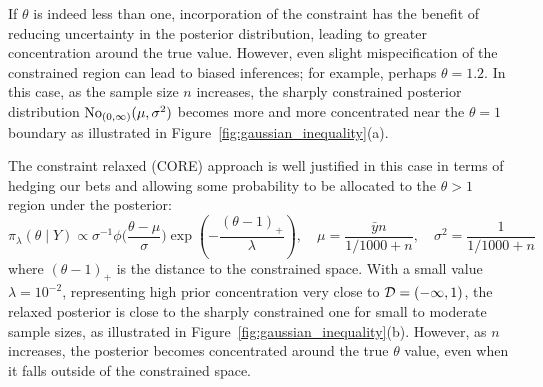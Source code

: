 \documentclass[10pt,fleqn]{article}
\DeclareMathOperator{\1}{\mathbbm{1}} \DeclareMathOperator{\bigO}{\mc O}
\begin{document}
If $\theta$ is indeed less than one, incorporation of the constraint has the benefit of reducing uncertainty in the posterior distribution, leading to greater concentration around the true value.  However, even slight mispecification of the constrained region can lead to biased inferences; for example, perhaps $\theta=1.2.$
In this case, as the sample size $n$ increases, the sharply constrained posterior distribution $\operatorname{No}_{(0,\infty)}(\mu,\sigma^2)$ becomes more and more concentrated near the $\theta=1$ boundary as illustrated in Figure~\ref{fig:gaussian_inequality}(a).

The constraint relaxed (CORE) approach is well justified in this case in terms of hedging our bets and allowing some probability to be allocated to the $\theta>1$ region under the posterior: 
$$ \pi_{\lambda}(\theta \mid Y) \propto {\sigma^{-1}}\phi\bigg(\frac{\theta- \mu}{\sigma}\bigg) \exp(-\frac{(\theta-1)_+ }{\lambda}) , \quad \mu=    \frac{ \bar y n}{ 1/1000 + n },   \quad \sigma^2 = \frac{1}{ 1/1000 + n }$$
where $(\theta-1)_+$ is the distance to the constrained space. With a small value $\lambda=10^{-2}$, representing high prior concentration very close to $\mathcal{D} = (-\infty,1)$, the relaxed posterior is close to 
the sharply constrained one for small to moderate sample sizes, as illustrated in Figure~\ref{fig:gaussian_inequality}(b).  However, as $n$ increases, the posterior becomes concentrated around the true $\theta$ value, even when it falls outside of the constrained space.
\end{document}
